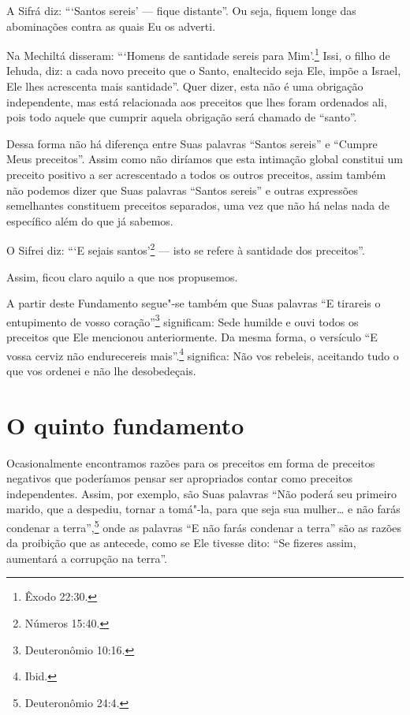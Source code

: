 A Sifrá\starr{} diz: ```Santos sereis' --- fique distante''. Ou seja, fiquem
longe das abominações contra as quais Eu os adverti.

Na Mechiltá\starr{} disseram: ```Homens de santidade sereis para Mim'.\footnote{Êxodo
22:30.} Issi\starr, o filho de Iehuda\starr, diz: a cada novo preceito que o Santo,
enaltecido seja Ele, impõe a Israel, Ele lhes acrescenta mais
santidade''. Quer dizer, esta não é uma obrigação independente, mas está
relacionada aos preceitos que lhes foram ordenados ali, pois todo aquele
que cumprir aquela obrigação será chamado de ``santo''.

Dessa forma não há diferença entre Suas palavras ``Santos sereis'' e
``Cumpre Meus preceitos''. Assim como não diríamos que esta intimação
global constitui um preceito positivo a ser acrescentado a todos os
outros preceitos, assim também não podemos dizer que Suas palavras
``Santos sereis'' e outras expressões semelhantes constituem preceitos
separados, uma vez que não há nelas nada de específico além do que já
sabemos.

O Sifrei\starr{} diz: ```E sejais santos'\footnote{Números 15:40.} --- isto se refere à
santidade dos preceitos''.

Assim, ficou claro aquilo a que nos propusemos.

A partir deste Fundamento segue"-se também que Suas palavras ``E tirareis
o entupimento de vosso coração''\footnote{Deuteronômio 10:16.} significam: Sede
humilde e ouvi todos os preceitos que Ele mencionou anteriormente. Da
mesma forma, o versículo ``E vossa cerviz não endurecereis mais''.\footnote{Ibid.} significa: Não vos rebeleis, aceitando tudo o que vos ordenei e
não lhe desobedeçais.

\chapter*{O quinto fundamento}

Ocasionalmente encontramos razões para os preceitos em forma de
preceitos negativos que poderíamos pensar ser apropriados contar como
preceitos independentes. Assim, por exemplo, são Suas palavras ``Não
poderá seu primeiro marido, que a despediu, tornar a tomá"-la, para que
seja sua mulher\ldots{} e não farás condenar a terra'',\footnote{Deuteronômio 24:4.}
onde as palavras ``E não farás condenar a terra'' são as razões da
proibição que as antecede, como se Ele tivesse dito: ``Se fizeres assim,
aumentará a corrupção na terra''.

